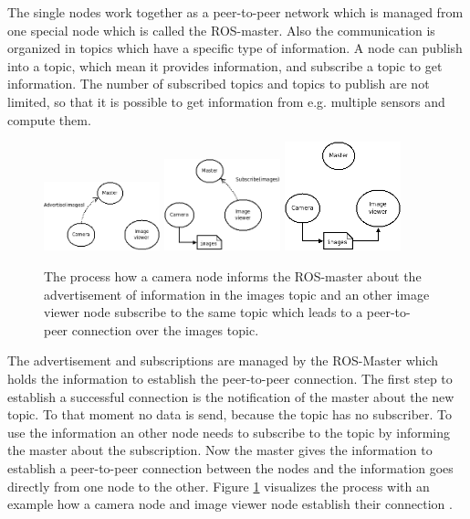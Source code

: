 The single nodes work together as a peer-to-peer network which is managed from one special node which is called the ROS-master.
Also the communication is organized in topics which have a specific type of information.
A node can publish into a topic, which mean it provides information, and subscribe a topic to get information.
The number of subscribed topics and topics to publish are not limited, so that it is possible to get information from e.g. multiple sensors and compute them.

\begin{figure}[h]
	\centering
	\includegraphics[width=0.30\textwidth]{img/ros_master/ros_master1.png}
	\includegraphics[width=0.30\textwidth]{img/ros_master/ros_master2.png}
	\includegraphics[width=0.30\textwidth]{img/ros_master/ros_master3.png}
	\caption{The process how a camera node informs the ROS-master about the advertisement of information in the images topic and an other image viewer node subscribe to the same topic which leads to a peer-to-peer connection over the images topic.}
    \label{fig:ros_master}
\end{figure}

The advertisement and subscriptions are managed by the ROS-Master which holds the information to establish the peer-to-peer connection.
The first step to establish a successful connection is the notification of the master about the new topic.
To that moment no data is send, because the topic has no subscriber.
To use the information an other node needs to subscribe to the topic by informing the master about the subscription.
Now the master gives the information to establish a peer-to-peer connection between the nodes and the information goes directly from one node to the other.
Figure \ref{fig:ros_master} visualizes the process with an example how a camera node and image viewer node establish their connection \cite{rosMaster}.

